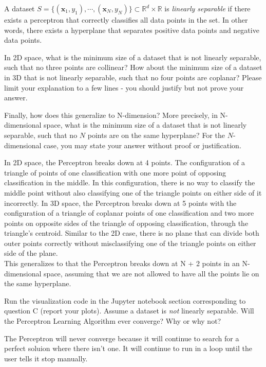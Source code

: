 \begin{problem}[4]
  A dataset $S = \{(\mathbf{x}_1, y_1),\cdots,(\mathbf{x}_N, y_N)\} \subset \mathbb{R}^d \times \mathbb{R}$ is \emph{linearly separable} if there exists a perceptron that correctly classifies all data points in the set. In other words, there exists a hyperplane that separates positive data points and negative data points.

  In 2D space, what is the minimum size of a dataset that is not linearly separable, such that no three points are collinear? How about the minimum size of a dataset in 3D that is not linearly separable, such that no four points are coplanar? Please limit your explanation to a few lines - you should justify but not prove your answer.

  Finally, how does this generalize to N-dimension? More precisely, in N-dimensional space, what is the minimum size of a dataset that is not linearly separable, such that no $N$ points are on the same hyperplane? For the $N$-dimensional case, you may state your answer without proof or justification.
\end{problem}
\begin{solution}
  In 2D space, the Perceptron breaks down at 4 points. The configuration of a triangle of points of one classification with one more point of opposing classification in the middle. In this configuration, there is no way to classify the middle point without also classifying one of the triangle points on either side of it incorrectly. In 3D space, the Perceptron breaks down at 5 points with the configuration of a triangle of coplanar points of one classification and two more points on opposite sides of the triangle of opposing classification, through the triangle's centroid. Similar to the 2D case, there is no plane that can divide both outer points correctly without misclassifying one of the triangle points on either side of the plane.  \\
  This generalizes to that the Perceptron breaks down at N + 2 points in an N-dimensional space, assuming that we are not allowed to have all the points lie  on the same hyperplane.
\end{solution}

\begin{problem}[2]
  Run the visualization code in the Jupyter notebook section corresponding to question C (report your plots). Assume a dataset is \emph{not} linearly separable. Will the Perceptron Learning Algorithm ever converge? Why or why not?
\end{problem}
\begin{solution}
  The Perceptron will never converge because it will continue to search for a perfect soluion where there isn't one. It will continue to run in a loop until the user tells it stop manually.
\end{solution}

